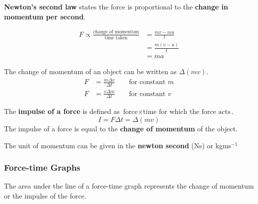 \textbf{Newton's second law} states the force is proportional to the \textbf{change in momentum per second}.

\begin{align*}
    F\propto\frac{\text{change of momentum}}{\text{time taken}}&=\frac{mv-mu}{t}\\
                                                               &=\frac{m(v-u)}{t}\\
                                                               &=ma
\end{align*}

The change of momentum of an object can be written as $\Delta(mv)$.
\begin{align*}
    F&=\frac{m\Delta v}{\Delta t}\qquad\text{for constant $m$}\\
    F&=\frac{v\Delta m}{\Delta t}\qquad\text{for constant $v$}
\end{align*}

The \textbf{impulse of a force} is defined as $\text{force}\times\text{time for which the force acts}$.
$$I=F\Delta t=\Delta(mv)$$
The impulse of a force is equal to the \textbf{change of momentum} of the object.

The unit of momentum can be given in the \textbf{newton second} (Ns) or kgms$^{-1}$

\subsubsection*{Force-time Graphs}

The area under the line of a force-time graph represents the change of momentum or the impulse of the force.
